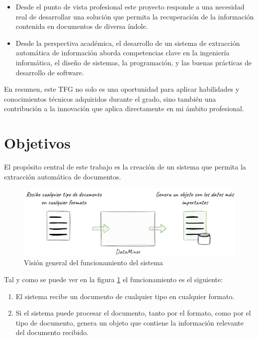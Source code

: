 \begin{itemize}
    \item
    Desde el punto de vista profesional este proyecto responde a una necesidad real de desarrollar una solución
    que permita la recuperación de la información contenida en documentos de diversa índole.
    \item
    Desde la perspectiva académica, el desarrollo de un sistema de extracción automática de información aborda
    competencias clave en la ingeniería informática, el diseño de sistemas, la programación, y las buenas prácticas de
    desarrollo de software.
\end{itemize}

En resumen, este TFG no solo es una oportunidad para aplicar habilidades y conocimientos técnicos adquiridos durante el
grado, sino también una contribución a la innovación que aplica directamente en mi ámbito profesional.


\section{Objetivos}

El propósito central de este trabajo es la creación de un sistema que permita la extracción automática de documentos.

\begin{figure}[ht]
    \begin{center}
        \includegraphics[width=\textwidth]{./chapter/1/images/chapter_1.overview}
        \caption{Visión general del funcionamiento del sistema}
        \label{fig:chapter_1.overview}
    \end{center}
\end{figure}

Tal y como se puede ver en la figura \ref{fig:chapter_1.overview} el funcionamiento es el siguiente:

\begin{enumerate}
    \item El sistema recibe un documento de cualquier tipo en cualquier formato.
    \item
    Si el sistema puede procesar el documento, tanto por el formato, como por el tipo de documento, genera un objeto que
    contiene la información relevante del documento recibido.
\end{enumerate}

